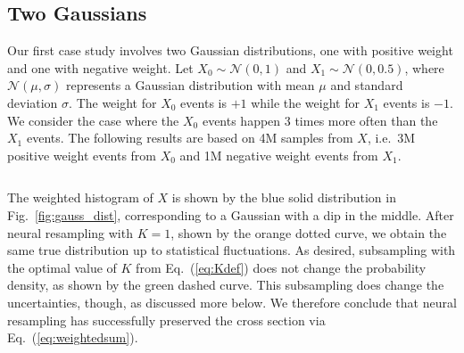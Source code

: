 \documentclass[prd,twocolumn,superscriptaddress,longbibliography,preprintnumbers,floatfix,nofootinbib]{revtex4-1}
\DeclareRobustCommand{\Fig}[1]{Fig.~\ref{fig:#1}}
\DeclareRobustCommand{\Eq}[1]{Eq.~(\ref{eq:#1})}
\begin{document}
\subsection{Two Gaussians}
\label{sec:gauss}



Our first case study involves two Gaussian distributions, one with positive weight and one with negative weight.
%
Let $X_0\sim\mathcal{N}(0,1)$ and $X_1\sim\mathcal{N}(0,0.5)$, where $\mathcal{N}(\mu,\sigma)$ represents a Gaussian distribution with mean $\mu$ and standard deviation $\sigma$.
%
The weight for $X_0$ events is $+1$ while the weight for $X_1$ events is $-1$.
%
We consider the case where the $X_0$ events happen $3$ times more often than the $X_1$ events.
%
The following results are based on 4M samples from $X$, i.e.\ 3M positive weight events from $X_0$ and 1M negative weight events from $X_1$.

\begin{figure*}[t]
\centering
{}
%
$\qquad$
%
%
\\
%
%
$\qquad$
%
\caption{
%
Demonstration of neural resampling in a simple one-dimensional example of two Gaussians.
%
(a) The (rescaled) cross section for observable $x$, estimated by summing the event weights in each histogram bin.
%
(b) The distribution of the event weights, including solid lines corresponding to the analytic expectations.
%
(c)  The (rescaled) uncertainties for observable $x$, estimated by summing the squared event weights in each histogram bin and taking the square root.
%
(d)  The number of events as a function of $x$.
%
The curves correspond to (solid blue) the original event sample with positive and negative weights, (orange dotted) neural resampling with $K = 1$ such that the cross section is preserved, and (green dashed) neural resampling with the optimal $K$ value in \Eq{Kdef} such that the cross sections and uncertainties are preserved.  Note that the ratio between the orange and green curves in \Fig{gauss_events} is $K(x)$, which is the local factor describing how many fewer events are needed after resampling.
}
\label{fig:gauss}
\end{figure*}

The weighted histogram of $X$ is shown by the blue solid distribution in \Fig{gauss_dist}, corresponding to a Gaussian with a dip in the middle.
%
After neural resampling with $K = 1$, shown by the orange dotted curve, we obtain the same true distribution up to statistical fluctuations.
%
As desired, subsampling with the optimal value of $K$ from \Eq{Kdef} does not change the probability density, as shown by the green dashed curve.
%
This subsampling does change the uncertainties, though, as discussed more below.
%
We therefore conclude that neural resampling has successfully preserved the cross section via \Eq{weightedsum}.
\end{document}
